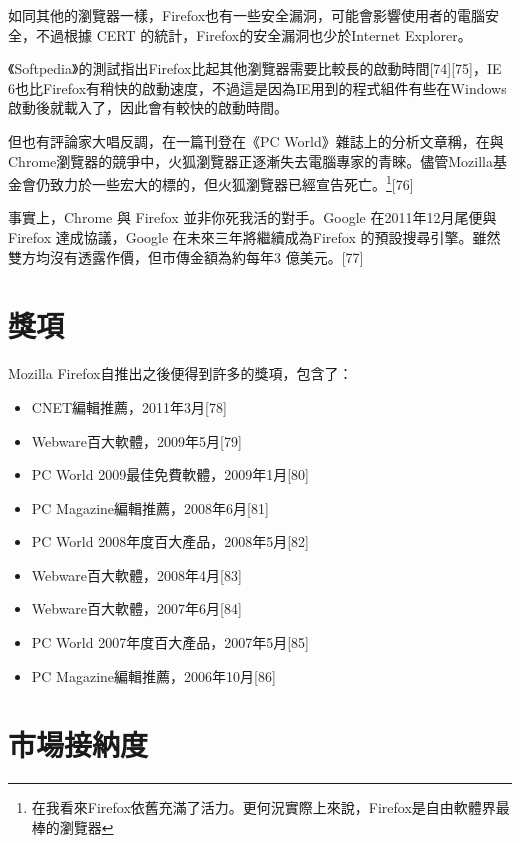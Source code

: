 \documentclass[12pt, a4paper, twoside]{article}
\begin{document}
如同其他的瀏覽器一樣，Firefox也有一些安全漏洞，可能會影響使用者的電腦安全，不過根據 CERT 的統計，Firefox的安全漏洞也少於Internet Explorer。

《Softpedia》的測試指出Firefox比起其他瀏覽器需要比較長的啟動時間[74][75]，IE 6也比Firefox有稍快的啟動速度，不過這是因為IE用到的程式組件有些在Windows啟動後就載入了，因此會有較快的啟動時間。

但也有評論家大唱反調，在一篇刊登在《PC World》雜誌上的分析文章稱，在與Chrome瀏覽器的競爭中，火狐瀏覽器正逐漸失去電腦專家的青睞。儘管Mozilla基金會仍致力於一些宏大的標的，但火狐瀏覽器已經宣告死亡。\footnote{在我看來Firefox依舊充滿了活力。更何況實際上來說，Firefox是自由軟體界最棒的瀏覽器}[76]

事實上，Chrome 與 Firefox 並非你死我活的對手。Google 在2011年12月尾便與Firefox 達成協議，Google 在未來三年將繼續成為Firefox 的預設搜尋引擎。雖然雙方均沒有透露作價，但市傳金額為約每年3 億美元。[77]

\section{獎項}

Mozilla Firefox自推出之後便得到許多的獎項，包含了：

\begin{itemize}
\item CNET編輯推薦，2011年3月[78]
\item Webware百大軟體，2009年5月[79]
\item PC World 2009最佳免費軟體，2009年1月[80]
\item PC Magazine編輯推薦，2008年6月[81]
\item PC World 2008年度百大產品，2008年5月[82]
\item Webware百大軟體，2008年4月[83]
\item Webware百大軟體，2007年6月[84]
\item PC World 2007年度百大產品，2007年5月[85]
\item PC Magazine編輯推薦，2006年10月[86]
\end{itemize}

\section{市場接納度}
\end{document}
